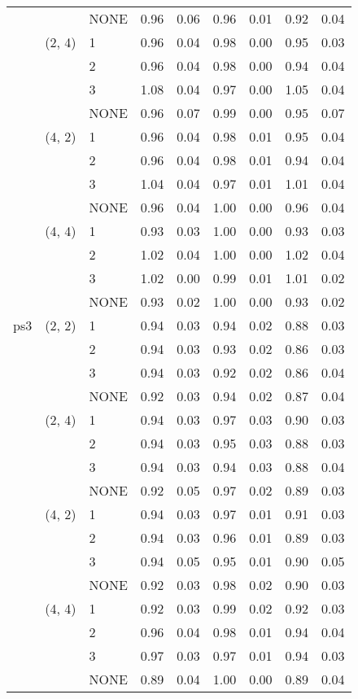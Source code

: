 \begin{tabular}{lllrrrrrr}
    &        & NONE &     0.96 & 0.06 &     0.96 & 0.01 &  0.92 & 0.04 \\
    & (2, 4) & 1 &     0.96 & 0.04 &     0.98 & 0.00 &  0.95 & 0.03 \\
    &        & 2 &     0.96 & 0.04 &     0.98 & 0.00 &  0.94 & 0.04 \\
    &        & 3 &     1.08 & 0.04 &     0.97 & 0.00 &  1.05 & 0.04 \\
    &        & NONE &     0.96 & 0.07 &     0.99 & 0.00 &  0.95 & 0.07 \\
    & (4, 2) & 1 &     0.96 & 0.04 &     0.98 & 0.01 &  0.95 & 0.04 \\
    &        & 2 &     0.96 & 0.04 &     0.98 & 0.01 &  0.94 & 0.04 \\
    &        & 3 &     1.04 & 0.04 &     0.97 & 0.01 &  1.01 & 0.04 \\
    &        & NONE &     0.96 & 0.04 &     1.00 & 0.00 &  0.96 & 0.04 \\
    & (4, 4) & 1 &     0.93 & 0.03 &     1.00 & 0.00 &  0.93 & 0.03 \\
    &        & 2 &     1.02 & 0.04 &     1.00 & 0.00 &  1.02 & 0.04 \\
    &        & 3 &     1.02 & 0.00 &     0.99 & 0.01 &  1.01 & 0.02 \\
    &        & NONE &     0.93 & 0.02 &     1.00 & 0.00 &  0.93 & 0.02 \\
ps3 & (2, 2) & 1 &     0.94 & 0.03 &     0.94 & 0.02 &  0.88 & 0.03 \\
    &        & 2 &     0.94 & 0.03 &     0.93 & 0.02 &  0.86 & 0.03 \\
    &        & 3 &     0.94 & 0.03 &     0.92 & 0.02 &  0.86 & 0.04 \\
    &        & NONE &     0.92 & 0.03 &     0.94 & 0.02 &  0.87 & 0.04 \\
    & (2, 4) & 1 &     0.94 & 0.03 &     0.97 & 0.03 &  0.90 & 0.03 \\
    &        & 2 &     0.94 & 0.03 &     0.95 & 0.03 &  0.88 & 0.03 \\
    &        & 3 &     0.94 & 0.03 &     0.94 & 0.03 &  0.88 & 0.04 \\
    &        & NONE &     0.92 & 0.05 &     0.97 & 0.02 &  0.89 & 0.03 \\
    & (4, 2) & 1 &     0.94 & 0.03 &     0.97 & 0.01 &  0.91 & 0.03 \\
    &        & 2 &     0.94 & 0.03 &     0.96 & 0.01 &  0.89 & 0.03 \\
    &        & 3 &     0.94 & 0.05 &     0.95 & 0.01 &  0.90 & 0.05 \\
    &        & NONE &     0.92 & 0.03 &     0.98 & 0.02 &  0.90 & 0.03 \\
    & (4, 4) & 1 &     0.92 & 0.03 &     0.99 & 0.02 &  0.92 & 0.03 \\
    &        & 2 &     0.96 & 0.04 &     0.98 & 0.01 &  0.94 & 0.04 \\
    &        & 3 &     0.97 & 0.03 &     0.97 & 0.01 &  0.94 & 0.03 \\
    &        & NONE &     0.89 & 0.04 &     1.00 & 0.00 &  0.89 & 0.04 \\
\bottomrule
\end{tabular}
